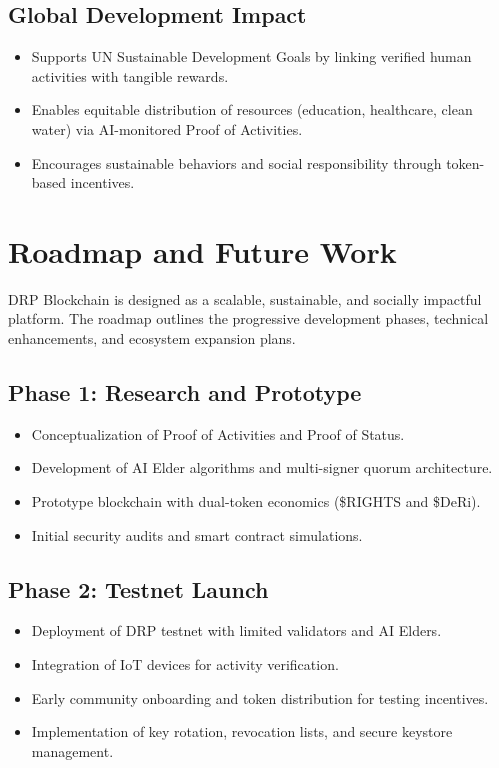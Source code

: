 \documentclass[11pt,a4paper]{article}
\begin{document}
\subsection{Global Development Impact}
\begin{itemize}
    \item Supports UN Sustainable Development Goals by linking verified human activities with tangible rewards.  
    \item Enables equitable distribution of resources (education, healthcare, clean water) via AI-monitored Proof of Activities.  
    \item Encourages sustainable behaviors and social responsibility through token-based incentives.  
\end{itemize}

\section{Roadmap and Future Work}

DRP Blockchain is designed as a scalable, sustainable, and socially impactful platform. The roadmap outlines the progressive development phases, technical enhancements, and ecosystem expansion plans.

\subsection{Phase 1: Research and Prototype}
\begin{itemize}
    \item Conceptualization of Proof of Activities and Proof of Status.  
    \item Development of AI Elder algorithms and multi-signer quorum architecture.  
    \item Prototype blockchain with dual-token economics (\$RIGHTS and \$DeRi).  
    \item Initial security audits and smart contract simulations.  
\end{itemize}

\subsection{Phase 2: Testnet Launch}
\begin{itemize}
    \item Deployment of DRP testnet with limited validators and AI Elders.  
    \item Integration of IoT devices for activity verification.  
    \item Early community onboarding and token distribution for testing incentives.  
    \item Implementation of key rotation, revocation lists, and secure keystore management.  
\end{itemize}
\end{document}
